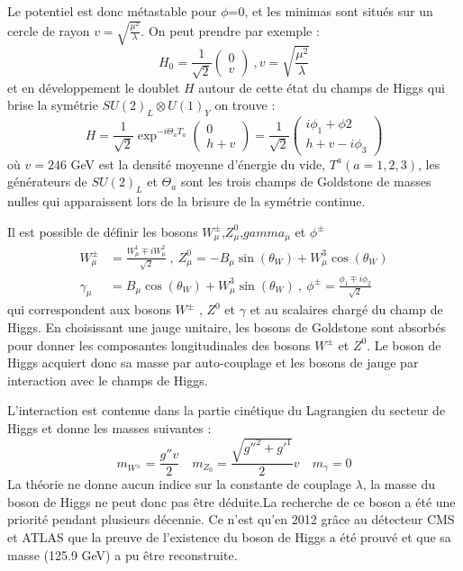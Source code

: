 Le potentiel est donc métastable pour $\phi$=0, et les minimas sont situés sur un cercle de rayon $v=\sqrt{\frac{\mu^{2}}{\lambda}}$. On peut prendre par exemple :
\begin{equation}
H_{0}=\frac{1}{\sqrt{2}}\begin{pmatrix} 
0\\
v
\end{pmatrix} \ , v=\sqrt{\frac{\mu^{2}}{\lambda}}
\end{equation}
et en développement le doublet $H$ autour de cette état du champs de Higgs qui brise la symétrie $SU(2)_{L}\otimes U(1)_{Y}$ on trouve : 
\begin{equation}
H=\frac{1}{\sqrt{2}}\exp^{-i\Theta_{a}T_{a}}\begin{pmatrix} 
0\\
h+v
\end{pmatrix}=\frac{1}{\sqrt{2}}\begin{pmatrix} 
i\phi_{1}+\phi{2}\\
h+v-i\phi_{3}
\end{pmatrix}
\end{equation}
où $v=246$ GeV est la densité moyenne d'énergie du vide, $T^{a} (a=1,2,3)$, les générateurs de $SU(2)_{L}$ et $\Theta_{a}$ sont les trois champs de Goldstone de masses nulles qui apparaissent lors de la brisure de la symétrie continue.

Il est possible de définir les bosons $W_{\mu}^{\pm}$,$Z_{\mu}^{0}$,$gamma_{\mu}$ et $\phi^{\pm}$ 
\begin{equation}
\begin{split}
W_{\mu}^{\pm}&=\frac{W_{\mu}^{1}\mp iW_{\mu}^{2}}{\sqrt{2}}\ , \ Z_{\mu}^{0}=-B_{\mu}\sin(\theta_{W})+W_{\mu}^{3}\cos(\theta_{W})\\
\gamma_{\mu}&=B_{\mu}\cos(\theta_{W})+W_{\mu}^{3}\sin(\theta_{W})\ , \ \phi^{\pm}=\frac{\phi_{1}\mp i\phi_{2}}{\sqrt{2}}
\end{split}
\end{equation}
qui correspondent aux bosons $W^{\pm}$ , $Z^{0}$ et $\gamma$ et au scalaires chargé du champ de Higgs. En choisissant une jauge unitaire, les bosons de Goldstone sont absorbés pour donner les composantes longitudinales des bosons $W^{\pm}$ et $Z^{0}$. Le boson de Higgs acquiert donc sa masse par auto-couplage et les bosons de jauge par interaction avec le champs de Higgs.

L'interaction est contenue dans la partie cinétique du Lagrangien du secteur de Higgs et donne les masses suivantes : 
\begin{equation}
m_{W^{\pm}}=\frac{g''v}{2} \quad m_{Z_{0}}=\frac{\sqrt{g''^{2}+g'^{1}}}{2}v \quad m_{\gamma}=0 
\end{equation} 
La théorie ne donne aucun indice sur la constante de couplage $\lambda$, la masse du boson de Higgs ne peut donc pas être déduite.La recherche de ce boson a été une priorité pendant plusieurs décennie. Ce n'est qu'en 2012 grâce au détecteur CMS et ATLAS que la preuve de l'existence du boson de Higgs a été prouvé et que sa masse (125.9 GeV) a pu être reconstruite. 

